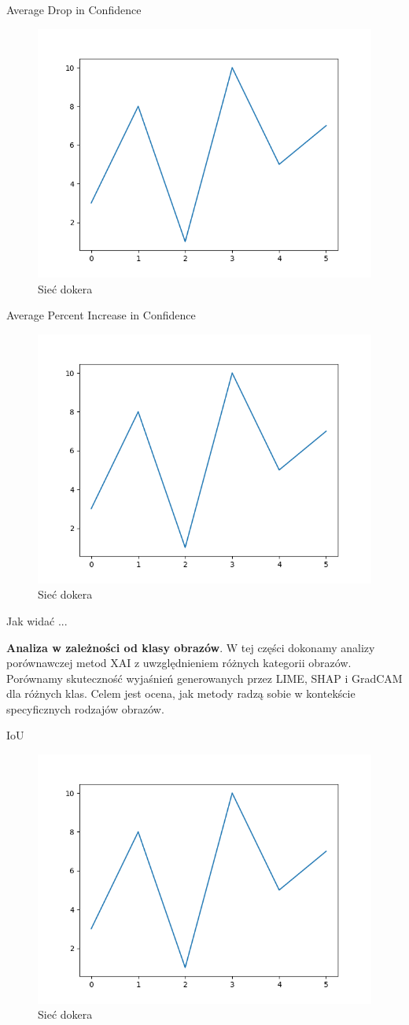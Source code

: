 Average Drop in Confidence
\begin{figure}
  \centering\includegraphics[width=.6\textwidth]{images/example}
\caption{Sieć dokera \cite{docker_compose_reference}}  \label{rys:network}
\end{figure}

Average Percent Increase in Confidence
\begin{figure}
  \centering\includegraphics[width=.6\textwidth]{images/example}
\caption{Sieć dokera \cite{docker_compose_reference}}  \label{rys:network}
\end{figure}

Jak widać ...

\textbf{Analiza w zależności od klasy obrazów}.
W tej części dokonamy analizy porównawczej metod XAI z uwzględnieniem różnych kategorii obrazów.
Porównamy skuteczność wyjaśnień generowanych przez LIME, SHAP i GradCAM dla różnych klas.
Celem jest ocena, jak metody radzą sobie w kontekście specyficznych rodzajów obrazów.

IoU
\begin{figure}
  \centering\includegraphics[width=.6\textwidth]{images/example}
\caption{Sieć dokera \cite{docker_compose_reference}}  \label{rys:network}
\end{figure}

